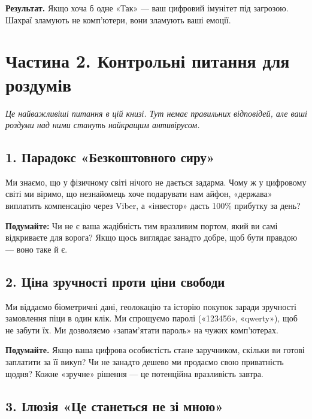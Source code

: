 \noindent\textbf{Результат.} Якщо хоча б одне «Так» — ваш цифровий імунітет під загрозою. Шахраї зламують не комп'ютери, вони зламують ваші емоції.

\vspace{0.3cm}

\section*{Частина 2. Контрольні питання для роздумів}
\vspace{-0.1cm}

\noindent\textit{Це найважливіші питання в цій книзі. Тут немає правильних відповідей, але ваші роздуми над ними стануть найкращим антивірусом.}

\vspace{0.25cm}

\subsection*{1. Парадокс «Безкоштовного сиру»}

Ми знаємо, що у фізичному світі нічого не дається задарма. Чому ж у цифровому світі ми віримо, що незнайомець хоче подарувати нам айфон, «держава» виплатить компенсацію через Viber, а «інвестор» дасть 100\% прибутку за день?

\textbf{Подумайте:} Чи не є ваша жадібність тим вразливим портом, який ви самі відкриваєте для ворога? Якщо щось виглядає занадто добре, щоб бути правдою — воно таке й є.

\vspace{0.25cm}

\subsection*{2. Ціна зручності проти ціни свободи}

Ми віддаємо біометричні дані, геолокацію та історію покупок заради зручності замовлення піци в один клік. Ми спрощуємо паролі («123456», «qwerty»), щоб не забути їх. Ми дозволяємо «запам'ятати пароль» на чужих комп'ютерах.

\textbf{Подумайте.} Якщо ваша цифрова особистість стане заручником, скільки ви готові заплатити за її викуп? Чи не занадто дешево ми продаємо свою приватність щодня? Кожне «зручне» рішення — це потенційна вразливість завтра.

\vspace{0.25cm}

\subsection*{3. Ілюзія «Це станеться не зі мною»}

